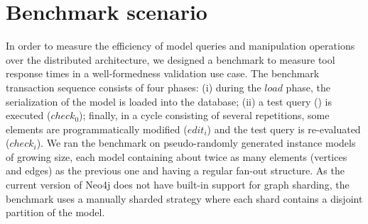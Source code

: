 



\section{Benchmark scenario}

\label{benchmark}
In order to measure the efficiency of model queries and manipulation operations over the distributed architecture, we designed a benchmark to measure tool response times in a well-formedness validation use case. The benchmark transaction sequence consists of four phases: (i) during the $\mathit{load}$ phase, the serialization of the model is loaded into the database; (ii) a test query () is executed ($\mathit{check}_0$); finally, in a cycle consisting of several repetitions, some elements are programmatically modified ($\mathit{edit}_i$) and the test query is re-evaluated ($\mathit{check}_i$). We ran the benchmark on pseudo-randomly generated instance models of growing size, each model containing about twice as many elements (vertices and edges) as the previous one and having a regular fan-out structure. As the current version of Neo4j does not have built-in support for graph sharding, the benchmark uses a manually sharded strategy where each shard contains a disjoint partition of the model.







